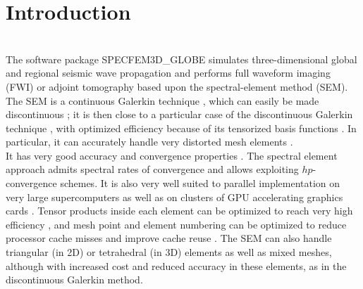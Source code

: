 \chapter{Introduction}

\\

The software package SPECFEM3D\_GLOBE simulates three-dimensional global and regional seismic wave propagation
and performs full waveform imaging (FWI) or adjoint tomography based upon the spectral-element method (SEM).
The SEM is a continuous Galerkin technique \citep{TrKoLi08,PeKoLuMaLeCaLeMaLiBlNiBaTr11},
which can easily be made discontinuous \citep{BeMaPa94,Ch00,KoWoHu02,ChCaVi03,LaWaBe05,Kop06,WiStBuGh10,AcKo11};
it is then close to a particular case of the discontinuous Galerkin technique \citep{ReHi73,LeRa74,Arn82,JoPi86,BoMaHe91,FaRi99,HuHuRa99,CoKaSh00,GiHeWa02,RiWh03,MoRi05,GrScSc06,AiMoMu06,BeLaPi06,DuKa06,DeSeWh08,PuAmKa09,WiStBuGh10,DeSe10,EtChViGl10}, with optimized efficiency because of its tensorized basis functions \citep{WiStBuGh10,AcKo11}.
In particular, it can accurately handle very distorted mesh elements \citep{OlSe11}.\\

It has very good accuracy and convergence properties \citep{MaPa89,SePr94,DeFiMu02,Coh02,DeSe07,SeOl08,AiWa09,AiWa10,MeStTh12}.
The spectral element approach admits spectral rates of convergence and allows exploiting $hp$-convergence schemes.
It is also very well suited to parallel implementation on very large supercomputers \citep{KoTsChTr03,TsKoChTr03,KoLaMi08a,CaKoLaTiMiLeSnTr08,KoViCh10} as well as on clusters of GPU accelerating graphics cards \citep{Kom11,MiKo10,KoMiEr09,KoErGoMi10}. Tensor products inside each element can be optimized to reach very high efficiency \citep{DeFiMu02}, and mesh point and element numbering can be optimized to reduce processor cache misses and improve cache reuse \citep{KoLaMi08a}. The SEM can also handle triangular (in 2D) or tetrahedral (in 3D) elements \citep{WinBoyd96,TaWi00,KoMaTrTaWi01,Coh02,MeViSa06} as well as mixed meshes, although with increased cost and reduced accuracy in these elements, as in the discontinuous Galerkin method.\\

